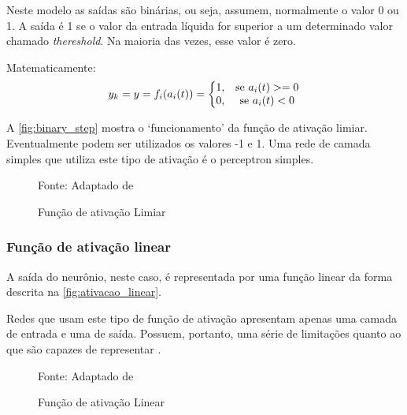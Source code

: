 Neste modelo as saídas são binárias, ou seja, assumem, normalmente o valor 0 ou 1. A saída é 1 se o valor da entrada líquida for superior a um determinado valor chamado \textit{thereshold}. Na maioria das vezes, esse valor é zero.

Matematicamente:
\begin{equation}\label{eq:limiar}
	y_k = y = f_i(a_i(t)) = \left \{ 
	\begin{matrix} 1\textrm{,} & \mbox{\textrm{se }}a_i(t) >= 0 \\
	0\mbox{\textrm{,}} & \mbox{\textrm{se }}a_i(t) < 0 \end{matrix} 
	\right.
\end{equation}

A \autoref{fig:binary_step} mostra o `funcionamento' da função de ativação limiar. Eventualmente podem ser utilizados os valores -1 e 1. Uma rede de camada simples que utiliza este tipo de ativação é o perceptron simples.

\begin{figure}[h!]
	\centering
	\caption{Função de ativação Limiar}

	{\scriptsize 	Fonte: Adaptado de }
	\label{fig:binary_step}
\end{figure}

\subsubsection{Função de ativação linear}\label{ativacao:linear}
A saída do neurônio, neste caso, é representada por uma função linear da forma descrita na \autoref{fig:ativacao_linear}. 

Redes que usam este tipo de função de ativação apresentam apenas uma camada de entrada e uma de saída. Possuem, portanto, uma série de limitações quanto ao que são capazes de representar \cite{lima_ia_2016}.

\begin{figure}[h!]
	\centering
	\caption{Função de ativação Linear}

	{\scriptsize Fonte: Adaptado de }
	\label{fig:ativacao_linear}
\end{figure}

